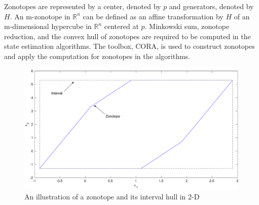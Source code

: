 Zonotopes are represented by a center, denoted by $p$ and generators, denoted by $H$. An m-zonotope in $\mathbb{R}^n$ can be defined as an affine transformation by $H$ of an m-dimensional hypercube in $\mathbb{R}^n$ centered at $p$. Minkowski sum, zonotope reduction, and the convex hull of zonotopes are required to be computed in the state estimation algorithms. The toolbox, CORA, is used to construct zonotopes and apply the computation for zonotopes in the algorithms. 
\begin{figure}[!h]
\label{fig:zonotope}
\includegraphics[scale=.25]{figures/zonotope}
\caption{An illustration of a zonotope and its interval hull in 2-D}
\end{figure}



